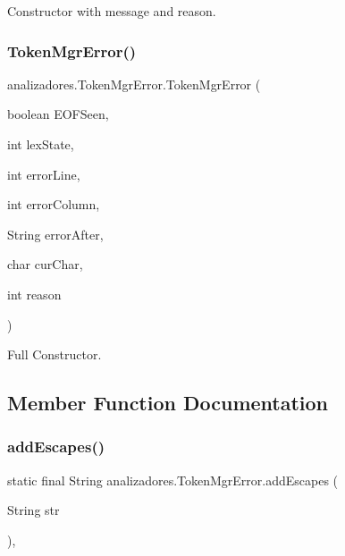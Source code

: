 Constructor with message and reason. \mbox{\label{classanalizadores_1_1_token_mgr_error_a085945c54985dd2a5c5281088d055e67}} 
\subsubsection{\texorpdfstring{Token\+Mgr\+Error()}{TokenMgrError()}\hspace{0.1cm}{\footnotesize\ttfamily [3/3]}}
{\footnotesize\ttfamily analizadores.\+Token\+Mgr\+Error.\+Token\+Mgr\+Error (\begin{DoxyParamCaption}\item[{boolean}]{E\+O\+F\+Seen,  }\item[{int}]{lex\+State,  }\item[{int}]{error\+Line,  }\item[{int}]{error\+Column,  }\item[{String}]{error\+After,  }\item[{char}]{cur\+Char,  }\item[{int}]{reason }\end{DoxyParamCaption})}

Full Constructor. 

\subsection{Member Function Documentation}
\mbox{\label{classanalizadores_1_1_token_mgr_error_a4d339ae7110c798549b2c27c2317bc0a}} 
\subsubsection{\texorpdfstring{add\+Escapes()}{addEscapes()}}
{\footnotesize\ttfamily static final String analizadores.\+Token\+Mgr\+Error.\+add\+Escapes (\begin{DoxyParamCaption}\item[{String}]{str }\end{DoxyParamCaption})\hspace{0.3cm}{\ttfamily [static]}, {\ttfamily [protected]}}

